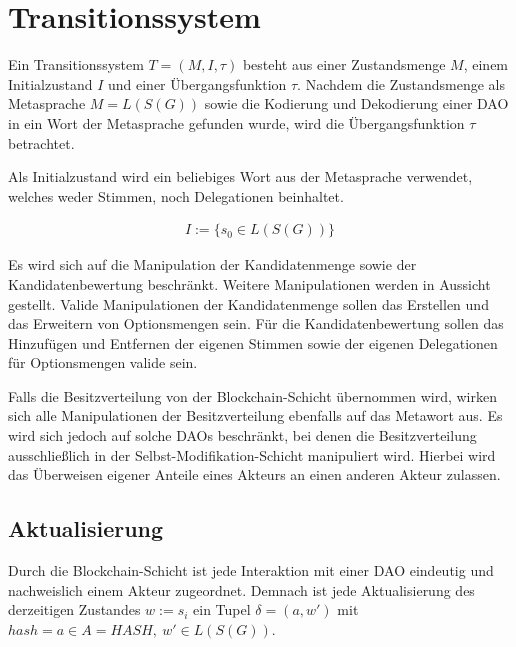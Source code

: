 \documentclass[a4paper,12pt]{report}
\begin{document}
\section{Transitionssystem}
\label{transsys}

Ein Transitionssystem $T=(M,I,\tau)$ besteht aus einer Zustandsmenge $M$, einem Initialzustand $I$ und einer Übergangsfunktion $\tau$.
Nachdem die Zustandsmenge als Metasprache $M=L(S(G))$ sowie die Kodierung und Dekodierung einer DAO in ein Wort der Metasprache gefunden wurde, wird die Übergangsfunktion $\tau$ betrachtet.

Als Initialzustand wird ein beliebiges Wort aus der Metasprache verwendet, welches weder Stimmen, noch Delegationen beinhaltet.

\begin{eqnarray}
I := \{s_0\in L(S(G))\}
\end{eqnarray}

Es wird sich auf die Manipulation der Kandidatenmenge sowie der Kandidatenbewertung beschränkt. Weitere Manipulationen werden in Aussicht gestellt. Valide Manipulationen der Kandidatenmenge sollen das Erstellen und das Erweitern von Optionsmengen sein. Für die Kandidatenbewertung sollen das Hinzufügen und Entfernen der eigenen Stimmen sowie der eigenen Delegationen für Optionsmengen valide sein. 

Falls die Besitzverteilung von der Blockchain-Schicht übernommen wird, 
wirken sich alle Manipulationen der Besitzverteilung ebenfalls auf das Metawort aus. Es wird sich jedoch auf solche DAOs beschränkt, bei denen die Besitzverteilung ausschließlich in der Selbst-Modifikation-Schicht manipuliert wird. Hierbei wird das Überweisen eigener Anteile eines Akteurs an einen anderen Akteur zulassen.


% 
% 
% 
% 
% 

\subsection{Aktualisierung}
Durch die Blockchain-Schicht ist jede Interaktion mit einer DAO eindeutig und nachweislich einem Akteur zugeordnet. Demnach ist jede Aktualisierung des derzeitigen Zustandes $w := s_i$ ein Tupel $\delta = (a,w')$ mit $hash=a\in A=HASH,\ w'\in L(S(G))$.
\end{document}
